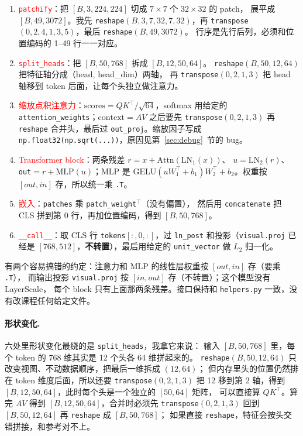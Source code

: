 \documentclass[a4paper,12pt]{article}
\newcommand{\mine}[1]{\textcolor{red}{#1}}
\begin{document}
\begin{enumerate}
  \item[(1)] \mine{\texttt{patchify}}：把 $[B,3,224,224]$ 切成 $7\times7$ 个 $32\times32$ 的 patch，
        展平成 $[B,49,3072]$。我先 \texttt{reshape}$(B,3,7,32,7,32)$，再
        \texttt{transpose}$(0,2,4,1,3,5)$，最后 \texttt{reshape}$(B,49,3072)$。
        行序是先行后列，必须和位置编码的 1--49 行一一对应。
  \item[(2)] \mine{\texttt{split\_heads}}：把 $[B,50,768]$ 拆成 $[B,12,50,64]$。
        \texttt{reshape}$(B,50,12,64)$ 把特征轴分成（head, head\_dim）两轴，
        再 \texttt{transpose}$(0,2,1,3)$ 把 head 轴移到 token 后面，让每个头独立做注意力。
  \item[(3)] \mine{缩放点积注意力}：$\mathrm{scores}=QK^\top/\sqrt{64}$，softmax 用给定的
        \texttt{attention\_weights}；$\mathrm{context}=AV$ 之后要先 \texttt{transpose}$(0,2,1,3)$
        再 \texttt{reshape} 合并头，最后过 \texttt{out\_proj}。缩放因子写成
        \texttt{np.float32(np.sqrt(...))}，原因见第~\ref{sec:debug}~节的 bug。
  \item[(4)] \mine{Transformer block}：两条残差 $r=x+\mathrm{Attn}(\mathrm{LN}_1(x))$、
        $u=\mathrm{LN}_2(r)$、\texttt{out}$=r+\mathrm{MLP}(u)$；MLP 是
        $\mathrm{GELU}(uW_1^\top+b_1)W_2^\top+b_2$。权重按 $[out,in]$ 存，所以统一乘 \texttt{.T}。
  \item[(5)] \mine{嵌入}：\texttt{patches} 乘 \texttt{patch\_weight}$^\top$（没有偏置），
        然后用 \texttt{concatenate} 把 CLS 拼到第 0 行，再加位置编码，得到 $[B,50,768]$。
  \item[(6)] \mine{\texttt{\_\_call\_\_}}：取 CLS 行 \texttt{tokens}$[:,0,:]$，过 \texttt{ln\_post}
        和投影（\texttt{visual.proj} 已经是 $[768,512]$，\textbf{不转置}），最后用给定的
        \texttt{unit\_vector} 做 $L_2$ 归一化。
\end{enumerate}

有两个容易搞错的约定：注意力和 MLP 的线性层权重按 $[out,in]$ 存（要乘 \texttt{.T}），
而输出投影 \texttt{visual.proj} 按 $[in,out]$ 存（不转置）；这个模型没有 LayerScale，
每个 block 只有上面那两条残差。接口保持和 \texttt{helpers.py} 一致，没有改课程任何给定文件。

\paragraph{形状变化.} 六处里形状变化最绕的是 \texttt{split\_heads}，我拿它来说：
输入 $[B,50,768]$ 里，每个 token 的 768 维其实是 12 个头各 64 维拼起来的。
\texttt{reshape}$(B,50,12,64)$ 只改变视图、不动数据顺序，把最后一维拆成 $(12,64)$；
但内存里头的位置仍然排在 token 维度后面，所以还要 \texttt{transpose}$(0,2,1,3)$
把 12 移到第 2 轴，得到 $[B,12,50,64]$，此时每个头是一个独立的 $[50,64]$ 矩阵，
可以直接算 $QK^\top$。算完 $AV$ 得到 $[B,12,50,64]$，合并时必须先
\texttt{transpose}$(0,2,1,3)$ 回到 $[B,50,12,64]$ 再 \texttt{reshape} 成 $[B,50,768]$；
如果直接 \texttt{reshape}，特征会按头交错拼接，和参考对不上。
\end{document}
